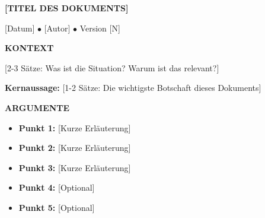 \documentclass[11pt,a4paper]{article}
\begin{document}
\begin{tcolorbox}[colback=headerblue!10!white, colframe=headerblue, 
    boxrule=0.5pt, arc=0pt]
    
\begin{center}
\textbf{\Large [TITEL DES DOKUMENTS]}

\small
[Datum] $\bullet$ [Autor] $\bullet$ Version [N]
\end{center}

\end{tcolorbox}

\vspace{0.5cm}

\textbf{\color{headerblue} KONTEXT}

[2-3 Sätze: Was ist die Situation? Warum ist das relevant?]

\vspace{0.3cm}

\begin{tcolorbox}[colback=headerblue!5!white, colframe=headerblue!50!white, 
    boxrule=0.3pt]
\textbf{Kernaussage:} [1-2 Sätze: Die wichtigste Botschaft dieses Dokuments]
\end{tcolorbox}

\vspace{0.3cm}

\textbf{\color{headerblue} ARGUMENTE}

\begin{itemize}[nosep, leftmargin=*]
\item \textbf{Punkt 1:} [Kurze Erläuterung]
\item \textbf{Punkt 2:} [Kurze Erläuterung]
\item \textbf{Punkt 3:} [Kurze Erläuterung]
\item \textbf{Punkt 4:} [Optional]
\item \textbf{Punkt 5:} [Optional]
\end{itemize}
\end{document}
